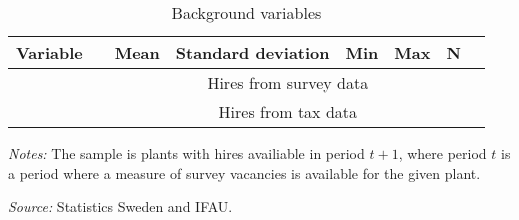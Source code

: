 \begin{table}[htbp]\centering
\begin{threeparttable}
\caption{\label{tab:tax_survey_comp} Background variables}
\begin{tabularx} {\textwidth} { l X c  c  c c c c} \\ \hline %
\textbf{ Variable } & & Mean  &  Standard deviation &  Min &  Max & N   \\
\midrule
&& \multicolumn{5}{c}{Hires from survey data} \\ \midrule

\midrule
&& \multicolumn{5}{c}{Hires from tax data} \\
\midrule

\midrule
\end{tabularx}
\begin{tablenotes}
\item \footnotesize{ \emph{Notes:} The sample is plants with hires availiable in period $t+1$, where period $t$ is a period where a measure of survey vacancies is available for the given plant. }
\item \footnotesize{ \emph{Source:} Statistics Sweden and IFAU. }
\end{tablenotes}
\end{threeparttable}
\end{table}
